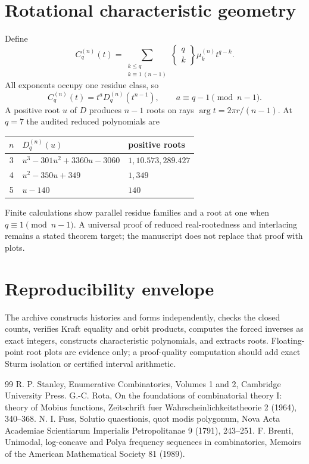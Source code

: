 \documentclass[11pt,a4paper]{article}
\begin{document}
\section{Rotational characteristic geometry}
Define
\begin{equation}
C_q^{(n)}(t)=
\sum_{\substack{k\le q\\k\equiv1\ (n-1)}}
\left\{\begin{matrix}q\\k\end{matrix}\right\}\mu_k^{(n)}t^{q-k}.
\end{equation}
All exponents occupy one residue class, so
\begin{equation}
C_q^{(n)}(t)=t^aD_q^{(n)}(t^{n-1}),
\qquad a\equiv q-1\pmod{n-1}.
\end{equation}
A positive root $u$ of $D$ produces $n-1$ roots on rays $\arg t=2\pi r/(n-1)$. At $q=7$ the audited reduced polynomials are
\begin{center}
\begin{tabular}{cll}
\toprule
$n$&$D_q^{(n)}(u)$&positive roots\\\midrule
3&$u^3-301u^2+3360u-3060$&$1,10.573,289.427$\\
4&$u^2-350u+349$&$1,349$\\
5&$u-140$&$140$\\
\bottomrule
\end{tabular}
\end{center}
Finite calculations show parallel residue families and a root at one when $q\equiv1\pmod{n-1}$. A universal proof of reduced real-rootedness and interlacing remains a stated theorem target; the manuscript does not replace that proof with plots.

\section{Reproducibility envelope}
The archive constructs histories and forms independently, checks the closed counts, verifies Kraft equality and orbit products, computes the forced inverses as exact integers, constructs characteristic polynomials, and extracts roots. Floating-point root plots are evidence only; a proof-quality computation should add exact Sturm isolation or certified interval arithmetic.

\begin{thebibliography}{99}
 R. P. Stanley, Enumerative Combinatorics, Volumes 1 and 2, Cambridge University Press.
 G.-C. Rota, On the foundations of combinatorial theory I: theory of Mobius functions, Zeitschrift fuer Wahrscheinlichkeitstheorie 2 (1964), 340--368.
 N. I. Fuss, Solutio quaestionis, quot modis polygonum, Nova Acta Academiae Scientiarum Imperialis Petropolitanae 9 (1791), 243--251.
 F. Brenti, Unimodal, log-concave and Polya frequency sequences in combinatorics, Memoirs of the American Mathematical Society 81 (1989).
\end{thebibliography}
\end{document}
